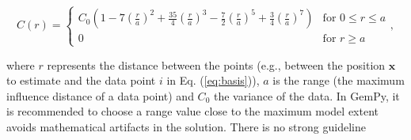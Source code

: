 \documentclass[final]{ring20}
\newcommand{\bx}{\mathbf{x}}
\begin{document}
\begin{equation}
C(r) = \begin{cases}
C_0(1-7(\frac{r}{a})^2+ \frac{35}{4}(\frac{r}{a})^3
- \frac{7}{2}(\frac{r}{a})^5 +\frac{3}{4}(\frac{r}{a})^7) &
\text{for } 0  \leq r \leq a \\
0 & \text{for } r  \geq a
\end{cases},
\end{equation}

where $r$ represents the distance between the points (e.g., between the position $\bx$ to estimate and the data point $i$ in Eq. (\ref{eq:basis})), $a$ is the range (the maximum influence distance of a data point) 
and $C_0$ the variance of the data. In GemPy, it is recommended to choose a range value close to the
maximum model extent avoids mathematical artifacts in the solution. There is no strong guideline 
\end{document}
